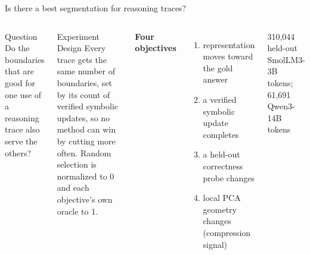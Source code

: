 \documentclass[aspectratio=169,10pt]{beamer}
\begin{document}
\begin{frame}{Is there a best segmentation for reasoning traces?}
\begin{columns}[T,onlytextwidth]
\begin{block}{Question}
Do the boundaries that are good for one use of a reasoning trace also serve the others?
\end{block}
\vspace{0.2cm}
\begin{block}{Experiment Design}
\small Every trace gets the same number of boundaries, set by its count of verified symbolic updates, so no method can win by cutting more often. Random selection is normalized to 0 and each objective's own oracle to 1.
\end{block}
\small
\textbf{Four objectives}
\begin{enumerate}\setlength\itemsep{4pt}
  \item representation moves toward the gold answer
  \item a verified symbolic update completes
  \item a held-out correctness probe changes
  \item local PCA geometry changes (compression signal)
\end{enumerate}
\vspace{0.25cm}
310{,}044 held-out SmolLM3-3B tokens; 61{,}691 Qwen3-14B tokens
\end{columns}
\end{frame}
\end{document}
